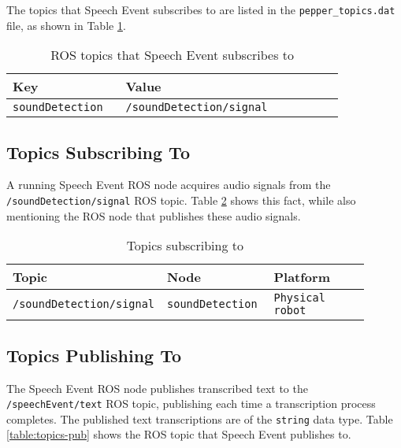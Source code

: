 \documentclass{CSSRforAfrica}
\begin{document}
The topics that Speech Event subscribes to are listed in the \texttt{pepper\_topics.dat} file, as shown in Table \ref{table:speechEvent-topics-file}.

\begin{center}
\begin{table}[thb]
\begin{tabular}[thb]{|p{0.31\linewidth}|p{0.60\linewidth}|}\hline
\rowcolor{lightgray} Key & Value \\ \hline
\texttt{soundDetection} & \texttt{/soundDetection/signal} \\ \hline
\end{tabular}
\caption{ROS topics that Speech Event subscribes to}
\label{table:speechEvent-topics-file}
\end{table}
\end{center}

\newpage
\subsection{Topics Subscribing To}

A running Speech Event ROS node acquires audio signals from the \texttt{/soundDetection/signal} ROS topic. Table \ref{table:topics-sub} shows this fact, while also mentioning the ROS node that publishes these audio signals.

\begin{center}
\begin{table}[thb]
\begin{tabular}[thb]{|p{0.32\linewidth}|p{0.30\linewidth}|p{0.28\linewidth}|} \hline
\rowcolor{lightgray} Topic & Node & Platform \\ \hline
\texttt{/soundDetection/signal} & \texttt{soundDetection} & \texttt{Physical robot} \\ \hline
\end{tabular}
\caption{Topics subscribing to}
\label{table:topics-sub}
\end{table}
\end{center}

\subsection{Topics Publishing To}

The Speech Event ROS node publishes transcribed text to the \texttt{/speechEvent/text} ROS topic, publishing each time a transcription process completes. The published text transcriptions are of the \texttt{string} data type. Table \ref{table:topics-pub} shows the ROS topic that Speech Event publishes to.
\end{document}
